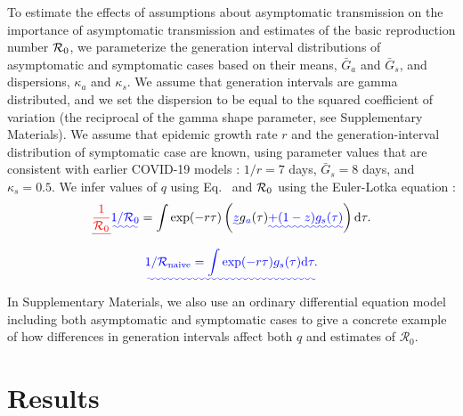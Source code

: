 To estimate the effects of assumptions about asymptomatic transmission on the importance of asymptomatic transmission and estimates of the basic reproduction number ${\cal{R}}_0$, we parameterize the generation interval distributions of asymptomatic and symptomatic cases based on their means, $\bar G_a$ and $\bar G_s$, and dispersions, $\kappa_a$ and $\kappa_s$.
We assume that generation intervals are gamma distributed, and we set the dispersion to be equal to the squared coefficient of variation (the reciprocal of the gamma shape parameter, see Supplementary Materials).
We assume that epidemic growth rate $r$ and the generation-interval distribution of symptomatic case are known, using parameter values that are consistent with earlier COVID-19 models \citep{park_preprint}: $1/r=7$ days, $\bar G_s=8$ days, and $\kappa_s=0.5$.
We infer values of $q$ using Eq.~ and ${\cal{R}}_0$ using the Euler-Lotka equation \citep{lotka1907relation}:
\begin{equation}
\DIFdelbegin \DIFdel{\frac{1}{\mathcal R_0} }\DIFdelend \DIFaddbegin \DIFadd{1/\mathcal R_0 }\DIFaddend = \int \exp(-r \tau) \DIFaddbegin \left(\DIFadd{z }\DIFaddend g\DIFaddbegin \DIFadd{_a}\DIFaddend (\tau) \DIFaddbegin \DIFadd{+ (1-z) g_s(\tau)}\right) \DIFaddend \mathrm{d} \tau.
\end{equation}
\DIFaddbegin {}\begin{equation}
\DIFadd{1/\mathcal R_{\tiny \textrm{naive}} = \int \exp(-r \tau) g_s(\tau) \mathrm{d} \tau.
}\end{equation}
\DIFaddend In Supplementary Materials, we also use an ordinary differential equation model \DIFaddbegin {}\DIFaddend including both asymptomatic and symptomatic cases to give a concrete example of how differences in generation intervals affect both $q$ and estimates of $\mathcal R_0$.

\section{Results}

